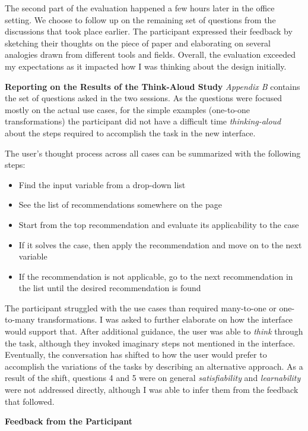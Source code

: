 \documentclass[12pt,letterpaper]{article}
\begin{document}
The second part of the evaluation happened a few hours later in the office setting. We choose to follow up on the remaining set of questions from the discussions that took place earlier. The participant expressed their feedback by sketching their thoughts on the piece of paper and elaborating on several analogies drawn from different tools and fields. Overall, the evaluation exceeded my expectations as it impacted how I was thinking about the design initially. 

\textbf{Reporting on the Results of the Think-Aloud Study}
\textit{Appendix B} contains the set of questions asked in the two sessions. As the questions were focused mostly on the actual use cases, for the simple examples (one-to-one transformations) the participant did not have a difficult time \textit{thinking-aloud} about the steps required to accomplish the task in the new interface. 

The user's thought process across all cases can be summarized with the following steps:

\begin{itemize}
    \item Find the input variable from a drop-down list
    \item See the list of recommendations somewhere on the page
    \item Start from the top recommendation and evaluate its applicability to the case
    \item If it solves the case, then apply the recommendation and move on to the next variable
    \item If the recommendation is not applicable, go to the next recommendation in the list until the desired recommendation is found
\end{itemize}

The participant struggled with the use cases than required many-to-one or one-to-many transformations. I was asked to further elaborate on how the interface would support that. After additional guidance, the user was able to \textit{think} through the task, although they invoked imaginary steps not mentioned in the interface. Eventually, the conversation has shifted to how the user would prefer to accomplish the variations of the tasks by describing an alternative approach. As a result of the shift, questions 4 and 5 were on general \textit{satisfiability} and \textit{learnability} were not addressed directly, although I was able to infer them from the feedback that followed. 
 
\textbf{Feedback from the Participant}
\end{document}
